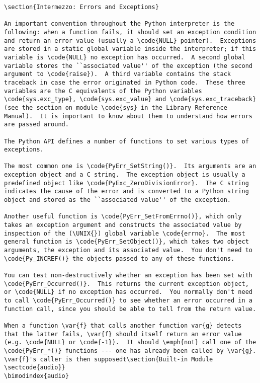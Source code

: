 \begin{verbatim}
\section{Intermezzo: Errors and Exceptions}

An important convention throughout the Python interpreter is the
following: when a function fails, it should set an exception condition
and return an error value (usually a \code{NULL} pointer).  Exceptions
are stored in a static global variable inside the interpreter; if this
variable is \code{NULL} no exception has occurred.  A second global
variable stores the ``associated value'' of the exception (the second
argument to \code{raise}).  A third variable contains the stack
traceback in case the error originated in Python code.  These three
variables are the C equivalents of the Python variables
\code{sys.exc_type}, \code{sys.exc_value} and \code{sys.exc_traceback}
(see the section on module \code{sys} in the Library Reference
Manual).  It is important to know about them to understand how errors
are passed around.

The Python API defines a number of functions to set various types of
exceptions.

The most common one is \code{PyErr_SetString()}.  Its arguments are an
exception object and a C string.  The exception object is usually a
predefined object like \code{PyExc_ZeroDivisionError}.  The C string
indicates the cause of the error and is converted to a Python string
object and stored as the ``associated value'' of the exception.

Another useful function is \code{PyErr_SetFromErrno()}, which only
takes an exception argument and constructs the associated value by
inspection of the (\UNIX{}) global variable \code{errno}.  The most
general function is \code{PyErr_SetObject()}, which takes two object
arguments, the exception and its associated value.  You don't need to
\code{Py_INCREF()} the objects passed to any of these functions.

You can test non-destructively whether an exception has been set with
\code{PyErr_Occurred()}.  This returns the current exception object,
or \code{NULL} if no exception has occurred.  You normally don't need
to call \code{PyErr_Occurred()} to see whether an error occurred in a
function call, since you should be able to tell from the return value.

When a function \var{f} that calls another function var{g} detects
that the latter fails, \var{f} should itself return an error value
(e.g. \code{NULL} or \code{-1}).  It should \emph{not} call one of the
\code{PyErr_*()} functions --- one has already been called by \var{g}.
\var{f}'s caller is then supposed t\section{Built-in Module \sectcode{audio}}
\bimodindex{audio}


\end{verbatim}

